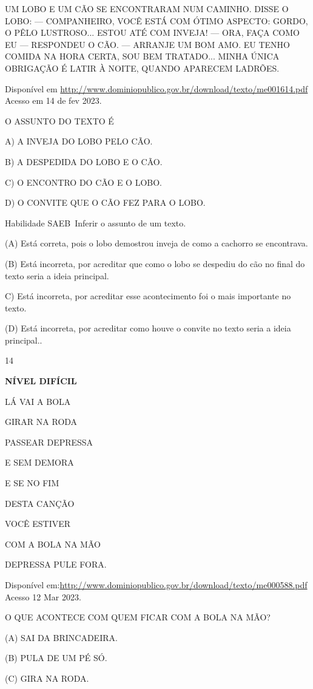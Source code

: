 {{UM LOBO E UM CÃO SE ENCONTRARAM NUM CAMINHO. DISSE O LOBO: ---
COMPANHEIRO, VOCÊ ESTÁ COM ÓTIMO ASPECTO: GORDO, O PÊLO LUSTROSO...
ESTOU ATÉ COM INVEJA! --- ORA, FAÇA COMO EU --- RESPONDEU O CÃO. ---
ARRANJE UM BOM AMO. EU TENHO COMIDA NA HORA CERTA, SOU BEM TRATADO...
MINHA ÚNICA OBRIGAÇÃO É LATIR À NOITE, QUANDO APARECEM LADRÕES.

\protect\hypertarget{_Hlk127335746}{}{}Disponível em
\url{http://www.dominiopublico.gov.br/download/texto/me001614.pdf}
Acesso em 14 de fev 2023.

O ASSUNTO DO TEXTO É

A) A INVEJA DO LOBO PELO CÃO.

B) A DESPEDIDA DO LOBO E O CÃO.

C) O ENCONTRO DO CÃO E O LOBO.

D) O CONVITE QUE O CÃO FEZ PARA O LOBO.

\protect\hypertarget{_Hlk127253071}{}{\protect\hypertarget{_Hlk127335662}{}{}}Habilidade
SAEB~Inferir o assunto de um texto.

(A) Está correta, pois o lobo demostrou inveja de como a cachorro se
encontrava.

(B) Está incorreta, por acreditar que como o lobo se despediu do cão no
final do texto seria a ideia principal.

C) Está incorreta, por acreditar esse acontecimento foi o mais
importante no texto.

(D) Está incorreta, por acreditar como houve o convite no texto seria a
ideia principal..

\num{14}

\textbf{NÍVEL DIFÍCIL}

LÁ VAI A BOLA

GIRAR NA RODA

PASSEAR DEPRESSA

E SEM DEMORA

E SE NO FIM

DESTA CANÇÃO

VOCÊ ESTIVER

COM A BOLA NA MÃO

DEPRESSA PULE FORA.

Disponível
em:\url{http://www.dominiopublico.gov.br/download/texto/me000588.pdf}
Acesso 12 Mar 2023.

O QUE ACONTECE COM QUEM FICAR COM A BOLA NA MÃO?

(A) SAI DA BRINCADEIRA.

(B) PULA DE UM PÉ SÓ.

(C) GIRA NA RODA.

}}

